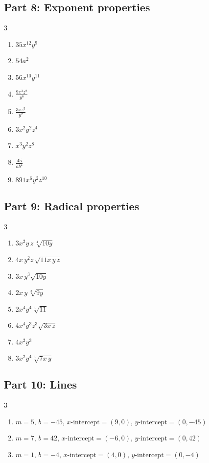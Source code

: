 \documentclass[11pt]{article}
\begin{document}
\subsection*{Part 8: Exponent properties}
\begin{multicols}{3}
\begin{enumerate}
  \item $35 x^{12} y^{9}$
  \item $54 a^{2}$
  \item $56 x^{10} y^{11}$
  \item $\frac{9 x^{3} z^{2}}{y^{6}}$
  \item $\frac{3 x z^{5}}{y^{2}}$
  \item $3 x^{2} y^{2} z^{4}$
  \item $x^{3} y^{2} z^{8}$
  \item $\frac{45}{a b^{2}}$
  \item $891 x^{6} y^{2} z^{10}$
\end{enumerate}
\end{multicols}
\subsection*{Part 9: Radical properties}
\begin{multicols}{3}
\begin{enumerate}
  \item $3x^{2}y\,z\,\sqrt[4]{10y}$
  \item $4x\,y^{2}z\,\sqrt{11x\,y\,z}$
  \item $3x\,y^{3}\sqrt{10y}$
  \item $2x\,y\,\sqrt[3]{9y}$
  \item $2x^{4}y^{4}\sqrt[3]{11}$
  \item $4x^{4}y^{3}z^{3}\sqrt{3x\,z}$
  \item $4x^{2}y^{3}$
  \item $3x^{2}y^{4}\sqrt[3]{7x\,y}$
\end{enumerate}
\end{multicols}
\subsection*{Part 10: Lines}
\begin{multicols}{3}
\begin{enumerate}
  \item $m = 5$, \quad $b = -45$, \quad $x\text{-intercept} = (9, 0)$, \quad $y\text{-intercept} = (0, -45)$
  \item $m = 7$, \quad $b = 42$, \quad $x\text{-intercept} = (-6, 0)$, \quad $y\text{-intercept} = (0, 42)$
  \item $m = 1$, \quad $b = -4$, \quad $x\text{-intercept} = (4, 0)$, \quad $y\text{-intercept} = (0, -4)$
\end{enumerate}
\end{multicols}
\end{document}
